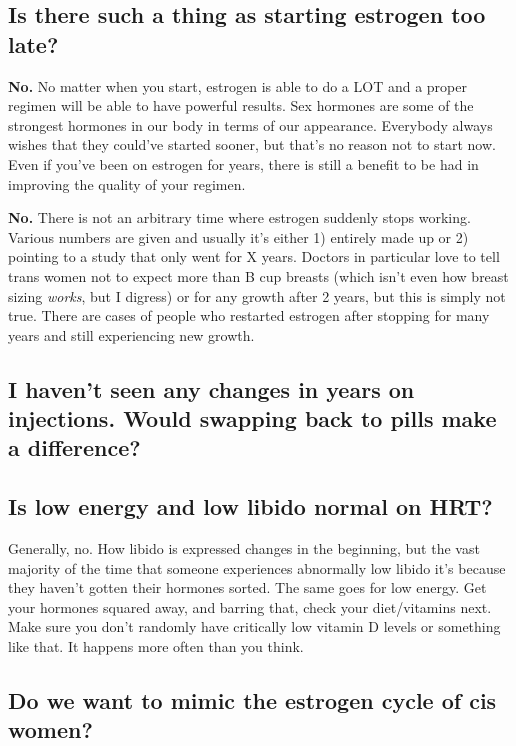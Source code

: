 \documentclass{article}
\begin{document}
\subsection{Is there such a thing as starting estrogen too late?}

\textbf{No.} No matter when you start, estrogen is able to do a LOT and a proper regimen will be able to have powerful results. Sex hormones are some of the strongest hormones in our body in terms of our appearance. Everybody always wishes that they could’ve started sooner, but that’s no reason not to start now. Even if you’ve been on estrogen for years, there is still a benefit to be had in improving the quality of your regimen.


\textbf{No.} There is not an arbitrary time where estrogen suddenly stops working. Various numbers are given and usually it’s either 1) entirely made up or 2) pointing to a study that only went for X years. Doctors in particular love to tell trans women not to expect more than B cup breasts (which isn’t even how breast sizing \textit{works}, but I digress) or for any growth after 2 years, but this is simply not true. There are cases of people who restarted estrogen after stopping for many years and still experiencing new growth.

\subsection{I haven’t seen any changes in years on injections. Would swapping back to pills make a difference?}


\subsection{Is low energy and low libido normal on HRT?}

Generally, no. How libido is expressed changes in the beginning, but the vast majority of the time that someone experiences abnormally low libido it’s because they haven’t gotten their hormones sorted. The same goes for low energy. Get your hormones squared away, and barring that, check your diet/vitamins next. Make sure you don’t randomly have critically low vitamin D levels or something like that. It happens more often than you think.



\subsection{Do we want to mimic the estrogen cycle of cis women?}\label{11-10}
\end{document}
